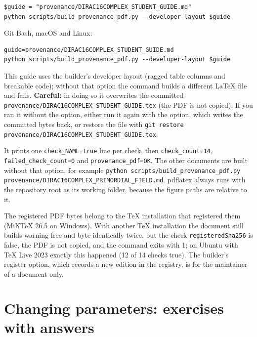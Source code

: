 \documentclass[11pt]{article}
\begin{document}
\begin{Verbatim}[fontsize=\small]
$guide = "provenance/DIRAC16COMPLEX_STUDENT_GUIDE.md"
python scripts/build_provenance_pdf.py --developer-layout $guide
\end{Verbatim}

Git Bash, macOS and Linux:

\begin{Verbatim}[fontsize=\small]
guide=provenance/DIRAC16COMPLEX_STUDENT_GUIDE.md
python scripts/build_provenance_pdf.py --developer-layout $guide
\end{Verbatim}

This guide uses the builder's developer layout (ragged table columns and breakable code); without that option the command builds a different LaTeX file and fails. \textbf{Careful:} in doing so it overwrites the committed \texttt{provenan\allowbreak{}ce/DIRAC\allowbreak{}16COMPLE\allowbreak{}X\_STUDEN\allowbreak{}T\_GUIDE.\allowbreak{}tex} (the PDF is not copied). If you ran it without the option, either run it again with the option, which writes the committed bytes back, or restore the file with \texttt{git rest\allowbreak{}ore prov\allowbreak{}enance/D\allowbreak{}IRAC16CO\allowbreak{}MPLEX\_ST\allowbreak{}UDENT\_GU\allowbreak{}IDE.tex}.

It prints one \texttt{check\_NA\allowbreak{}ME=true} line per check, then \texttt{check\_co\allowbreak{}unt=14}, \texttt{failed\_c\allowbreak{}heck\_cou\allowbreak{}nt=0} and \texttt{provenan\allowbreak{}ce\_pdf=O\allowbreak{}K}. The other documents are built without that option, for example \texttt{python s\allowbreak{}cripts/b\allowbreak{}uild\_pro\allowbreak{}venance\_\allowbreak{}pdf.py p\allowbreak{}rovenanc\allowbreak{}e/DIRAC1\allowbreak{}6COMPLEX\allowbreak{}\_PRIMORD\allowbreak{}IAL\_FIEL\allowbreak{}D.md}. pdflatex always runs with the repository root as its working folder, because the figure paths are relative to it.

The registered PDF bytes belong to the TeX installation that registered them (MiKTeX 26.5 on Windows). With another TeX installation the document still builds warning-free and byte-identically twice, but the check \texttt{register\allowbreak{}edSha256} is false, the PDF is not copied, and the command exits with 1; on Ubuntu with TeX Live 2023 exactly this happened (12 of 14 checks true). The builder's register option, which records a new edition in the registry, is for the maintainer of a document only.

\section{Changing parameters: exercises with answers}
\end{document}
